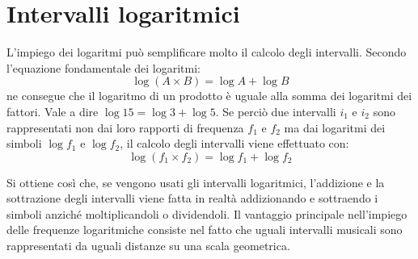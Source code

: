 \section{Intervalli logaritmici}

L'impiego dei logaritmi può semplificare molto il calcolo degli intervalli.
Secondo l'equazione fondamentale dei logaritmi:
\[
  \log(A \times B) = \log A + \log B
\]
ne consegue che il logaritmo di un prodotto è uguale alla somma dei logaritmi
dei fattori. Vale a dire $\log 15 = \log 3 + \log 5$. Se perciò due intervalli
$i_1$ e $i_2$ sono rappresentati non dai loro rapporti di frequenza $f_1$ e
$f_2$ ma dai logaritmi dei simboli $\log f_1$ e $\log f_2$, il calcolo degli
intervalli viene effettuato con:
\[
  \log(f_1 \times f_2) = \log f_1 + \log f_2
\]

Si ottiene così che, se vengono usati gli intervalli logaritmici, l'addizione e
la sottrazione degli intervalli viene fatta in realtà addizionando e sottraendo
i simboli anziché moltiplicandoli o dividendoli. Il vantaggio principale
nell'impiego delle frequenze logaritmiche consiste nel fatto che uguali
intervalli musicali sono rappresentati da uguali distanze su una scala
geometrica.

\begin{figure}[htbp]
  \centering
\end{figure}


